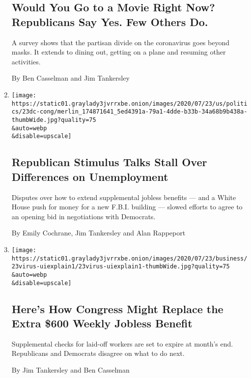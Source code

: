 \begin{enumerate}
  \hypertarget{would-you-go-to-a-movie-right-now-republicans-say-yes-few-others-do}{%
  \subsection{Would You Go to a Movie Right Now? Republicans Say Yes.
  Few Others
  Do.}\label{would-you-go-to-a-movie-right-now-republicans-say-yes-few-others-do}}

  A survey shows that the partisan divide on the coronavirus goes beyond
  masks. It extends to dining out, getting on a plane and resuming other
  activities.

  By Ben Casselman and Jim Tankersley
\item
  \href{/2020/07/23/us/politics/republicans-stimulus-coronavirus.html}{}

  \texttt{[image: https://static01.graylady3jvrrxbe.onion/images/2020/07/23/us/politics/23dc-cong/merlin\_174871641\_5ed4391a-79a1-4dde-b33b-34a68b9b438a-thumbWide.jpg?quality=75\\\&auto=webp\\\&disable=upscale]}

  \hypertarget{republican-stimulus-talks-stall-over-differences-on-unemployment}{%
  \subsection{Republican Stimulus Talks Stall Over Differences on
  Unemployment}\label{republican-stimulus-talks-stall-over-differences-on-unemployment}}

  Disputes over how to extend supplemental jobless benefits --- and a
  White House push for money for a new F.B.I. building --- slowed
  efforts to agree to an opening bid in negotiations with Democrats.

  By Emily Cochrane, Jim Tankersley and Alan Rappeport
\item
  \href{/2020/07/23/business/economy/unemployment-benefits.html}{}

  \texttt{[image: https://static01.graylady3jvrrxbe.onion/images/2020/07/23/business/23virus-uiexplain1/23virus-uiexplain1-thumbWide.jpg?quality=75\\\&auto=webp\\\&disable=upscale]}

  \hypertarget{heres-how-congress-might-replace-the-extra-600-weekly-jobless-benefit}{%
  \subsection{Here's How Congress Might Replace the Extra \$600 Weekly
  Jobless
  Benefit}\label{heres-how-congress-might-replace-the-extra-600-weekly-jobless-benefit}}

  Supplemental checks for laid-off workers are set to expire at month's
  end. Republicans and Democrats disagree on what to do next.

  By Jim Tankersley and Ben Casselman
\end{enumerate}

